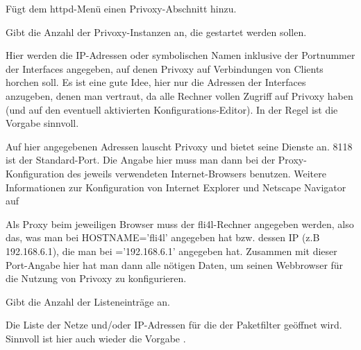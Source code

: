 \begin{description}


Fügt dem httpd-Menü einen Privoxy-Abschnitt hinzu.


        Gibt die Anzahl der Privoxy-Instanzen an, die gestartet werden sollen.


        {Hier werden die IP-Adressen oder symbolischen Namen inklusive
        der Portnummer der Interfaces angegeben, auf denen Privoxy auf
        Verbindungen von Clients horchen soll. Es ist eine gute Idee,
        hier nur die Adressen der Interfaces anzugeben, denen man
        vertraut, da alle Rechner vollen Zugriff auf Privoxy haben
        (und auf den eventuell aktivierten Konfigurations-Editor). In
        der Regel ist die Vorgabe 
        sinnvoll.

        Auf hier angegebenen Adressen lauscht Privoxy und bietet seine
        Dienste an.  8118 ist der Standard-Port. Die Angabe hier muss
        man dann bei der Proxy-Konfiguration des jeweils verwendeten
        Internet-Browsers benutzen.  Weitere Informationen zur
        Konfiguration von Internet Explorer und Netscape Navigator auf

         

        Als Proxy beim jeweiligen Browser muss der fli4l-Rechner
        angegeben werden, also das, was man bei HOSTNAME='fli4l'
        angegeben hat bzw.  dessen IP (z.B 192.168.6.1), die man bei
        ='192.168.6.1' angegeben hat. Zusammen
        mit dieser Port-Angabe hier hat man dann alle nötigen Daten,
        um seinen Webbrowser für die Nutzung von Privoxy zu
        konfigurieren.}


        {Gibt die Anzahl der Listeneinträge an.}


        Die Liste der Netze und/oder IP-Adressen für die der
        Paketfilter geöffnet wird. Sinnvoll ist hier auch wieder die
        Vorgabe .


\end{description}
